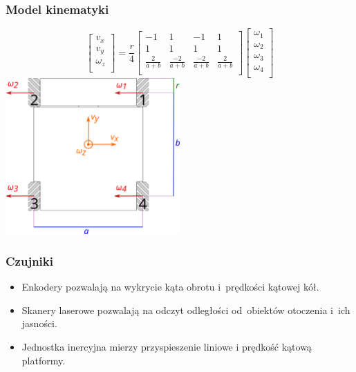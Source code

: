 \documentclass{beamer}
\begin{document}
	\begin{frame}
		\frametitle{Model kinematyki}
		\[
		\begin{bmatrix}
		v_x \\
		v_y \\
		\omega_z \\
		\end{bmatrix}
		=
		\frac{r}{4}
		\begin{bmatrix}
		-1 & 1 & -1 & 1 \\
		1 & 1 & 1 & 1 \\
		\frac{2}{a+b} & \frac{-2}{a+b} & \frac{-2}{a+b} & \frac{2}{a+b} \\
		\end{bmatrix}
		\begin{bmatrix}
		\omega_1 \\
		\omega_2 \\
		\omega_3 \\
		\omega_4 \\
		\end{bmatrix}
		\]
		\centering
		\includegraphics[width=0.5\textwidth]{graphics/base_dims.pdf} 
	\end{frame}

	\begin{frame}
		\frametitle{Czujniki}
		\begin{itemize}
			\item Enkodery pozwalają na wykrycie kąta obrotu i~prędkości kątowej kół.
			\item Skanery laserowe pozwalają na odczyt odległości od~obiektów otoczenia i~ich jasności.
			\item Jednostka inercyjna mierzy przyspieszenie liniowe i prędkość kątową platformy.
		\end{itemize}
	\end{frame}
	
	
	
\end{document}
